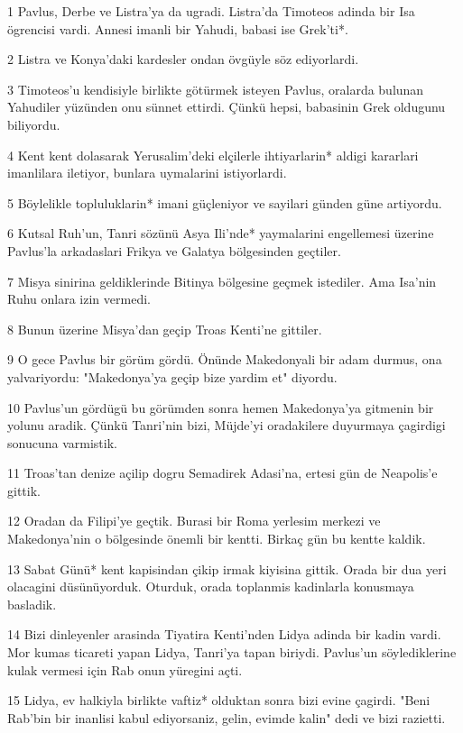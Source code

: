 \par 1 Pavlus, Derbe ve Listra'ya da ugradi. Listra'da Timoteos adinda bir Isa ögrencisi vardi. Annesi imanli bir Yahudi, babasi ise Grek'ti*.
\par 2 Listra ve Konya'daki kardesler ondan övgüyle söz ediyorlardi.
\par 3 Timoteos'u kendisiyle birlikte götürmek isteyen Pavlus, oralarda bulunan Yahudiler yüzünden onu sünnet ettirdi. Çünkü hepsi, babasinin Grek oldugunu biliyordu.
\par 4 Kent kent dolasarak Yerusalim'deki elçilerle ihtiyarlarin* aldigi kararlari imanlilara iletiyor, bunlara uymalarini istiyorlardi.
\par 5 Böylelikle topluluklarin* imani güçleniyor ve sayilari günden güne artiyordu.
\par 6 Kutsal Ruh'un, Tanri sözünü Asya Ili'nde* yaymalarini engellemesi üzerine Pavlus'la arkadaslari Frikya ve Galatya bölgesinden geçtiler.
\par 7 Misya sinirina geldiklerinde Bitinya bölgesine geçmek istediler. Ama Isa'nin Ruhu onlara izin vermedi.
\par 8 Bunun üzerine Misya'dan geçip Troas Kenti'ne gittiler.
\par 9 O gece Pavlus bir görüm gördü. Önünde Makedonyali bir adam durmus, ona yalvariyordu: "Makedonya'ya geçip bize yardim et" diyordu.
\par 10 Pavlus'un gördügü bu görümden sonra hemen Makedonya'ya gitmenin bir yolunu aradik. Çünkü Tanri'nin bizi, Müjde'yi oradakilere duyurmaya çagirdigi sonucuna varmistik.
\par 11 Troas'tan denize açilip dogru Semadirek Adasi'na, ertesi gün de Neapolis'e gittik.
\par 12 Oradan da Filipi'ye geçtik. Burasi bir Roma yerlesim merkezi ve Makedonya'nin o bölgesinde önemli bir kentti. Birkaç gün bu kentte kaldik.
\par 13 Sabat Günü* kent kapisindan çikip irmak kiyisina gittik. Orada bir dua yeri olacagini düsünüyorduk. Oturduk, orada toplanmis kadinlarla konusmaya basladik.
\par 14 Bizi dinleyenler arasinda Tiyatira Kenti'nden Lidya adinda bir kadin vardi. Mor kumas ticareti yapan Lidya, Tanri'ya tapan biriydi. Pavlus'un söylediklerine kulak vermesi için Rab onun yüregini açti.
\par 15 Lidya, ev halkiyla birlikte vaftiz* olduktan sonra bizi evine çagirdi. "Beni Rab'bin bir inanlisi kabul ediyorsaniz, gelin, evimde kalin" dedi ve bizi razietti.
